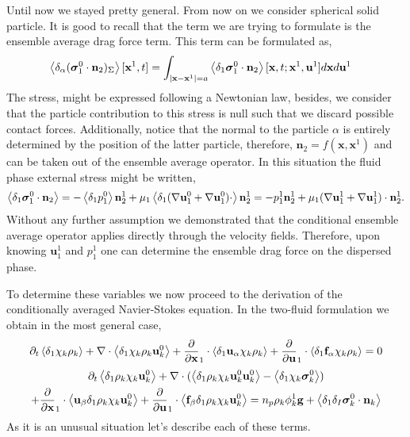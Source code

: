 Until now we stayed pretty general. 
From now on we consider spherical solid particle.
It is good to recall that the term we are trying to formulate is the ensemble average  drag force term. 
This term can be formulated as, 
\begin{align}
    \left<\delta_\alpha ( \bm\sigma_1^0\cdot\textbf{n}_2 )_{\Sigma}\right>[\textbf{x}^1,t]
    &=
    \int_{|\textbf{x}-\textbf{x}^1|=a}
    \left<\delta_1  \bm\sigma_1^0\cdot \textbf{n}_2\right>
    [\textbf{x},t;\textbf{x}^1,\textbf{u}^1]
    d\textbf{x}
    d\textbf{u}^1
\end{align}
The stress, might be expressed following a Newtonian law, besides, we consider that the particle contribution to this stress is null such that we discard possible contact forces. 
Additionally, notice that the normal to the particle $\alpha$ is entirely determined by the position of the latter particle, therefore, $\textbf{n}_2 = f(\textbf{x},\textbf{x}^1)$ and can be taken out of the ensemble average operator. 
In this situation the fluid phase external stress might be written, 
\begin{equation*}
    \left<\delta_1  \bm\sigma_1^0\cdot \textbf{n}_2\right>
    = 
    - \left<\delta_1  p_1^0 \right>\textbf{n}_2^1
    + \mu_1 \left<\delta_1  (\mathbf{\nabla} \textbf{u}_1^0 + \mathbf{\nabla} \textbf{u}_1^0)\cdot \right>\textbf{n}_2^1
    = 
    -   p_1^1 \textbf{n}_2^1
    + \mu_1  (\mathbf{\nabla} \textbf{u}_1^1 + \mathbf{\nabla} \textbf{u}_1^1) \cdot \textbf{n}_2^1. 
\end{equation*}
Without any further assumption we demonstrated that the conditional ensemble average operator applies directly through the velocity fields. 
Therefore, upon knowing $\textbf{u}_1^1$ and $p_1^1$ one can determine the ensemble drag force on the dispersed phase. 







To determine these variables we now proceed to the derivation of the conditionally averaged Navier-Stokes equation. 
In the two-fluid formulation we obtain in the most general case, 
\begin{equation}
    \partial_t \left<\delta_1 \chi_k \rho_k\right>
    +  \mathbf{\nabla}\cdot \left<\delta_1 \chi_k \rho_k \textbf{u}_k^0\right>
    +  \frac{\partial}{\partial \textbf{x}}_1 \cdot
    \left<\delta_1 \textbf{u}_\alpha \chi_k \rho_k\right>
    +  \frac{\partial}{\partial \textbf{u}}_1 \cdot
    \left<\delta_1  \textbf{f}_\alpha \chi_k \rho_k\right>
    = 0
\end{equation}
\begin{multline}
    \partial_t \left<\delta_1 \rho_k \chi_k \textbf{u}_k^0 \right>
    + \mathbf{\nabla}\cdot(
        \left<\delta_1 \rho_k \chi_k \textbf{u}_k^0 \textbf{u}^0_k  \right>
    - \left<\delta_1\chi_k\bm\sigma^0_k\right>)\\
    + \frac{\partial}{\partial \textbf{x}}_1 \cdot
        \left<\textbf{u}_\beta\delta_1 \rho_k \chi_k \textbf{u}_k^0 \right>
    + \frac{\partial}{\partial \textbf{u}}_1 \cdot
        \left<\textbf{f}_\beta\delta_1 \rho_k \chi_k \textbf{u}_k^0 \right>
    = n_p  \rho_k \phi_k^1 \textbf{g} 
    + \left<\delta_1\delta_I \bm\sigma_k^0 \cdot \textbf{n}_k\right>
\end{multline}
As it is an unusual situation let's describe each of these terms. 


